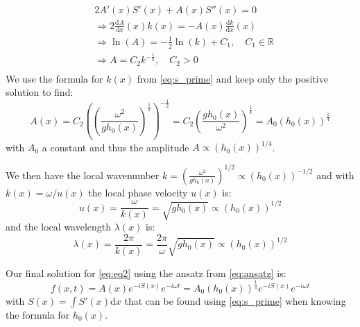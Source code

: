 \[
    \begin{aligned}
        & 2A'(x)S'(x) + A(x)S''(x) = 0 \\
        & \Rightarrow 2\frac{\mathrm{d}A}{\mathrm{d}x}(x)k(x) = - A(x) \frac{\mathrm{d}k}{\mathrm{d}x}(x) \\
        & \Rightarrow \ln(A) = -\frac{1}{2}\ln(k) + C_1, \quad C_1 \in \mathbb{R} \\
        & \Rightarrow A = C_2 k^{-\frac{1}{2}}, \quad C_2>0 \\
    \end{aligned}
\]
We use the formula for $k(x)$ from \autoref{eq:s_prime} and keep only the positive solution to find:
\begin{equation}
    A(x) = C_2 \left(\left(\frac{\omega^2}{gh_0(x)}\right)^{\frac{1}{2}}\right)^{-\frac{1}{2}} = C_2 \left(\frac{gh_0(x)}{\omega^2}\right)^\frac{1}{4} = A_0 (h_0(x))^\frac{1}{4}
\end{equation}
with $A_0$ a constant and thus the amplitude $A \propto (h_0(x))^{1/4}$.

We then have the local wavenumber $k = \left(\frac{\omega^2}{gh_0(x)}\right)^{1/2} \propto (h_0(x))^{-1/2}$ and with $k(x) = \omega / u(x)$ the local phase velocity $u(x)$ is:
\begin{equation}
    u(x) = \frac{\omega}{k(x)} = \sqrt{gh_0(x)} \propto (h_0(x))^{1/2}
\end{equation}
and the local wavelength $\lambda(x)$ is:
\begin{equation}
    \lambda(x) = \frac{2\pi}{k(x)} = \frac{2\pi}{\omega}\sqrt{gh_0(x)}  \propto (h_0(x))^{1/2}
\end{equation}

Our final solution for \autoref{eq:eq2} using the ansatz from \autoref{eq:ansatz} is:
\begin{equation}
    f(x,t) = A(x)e^{-iS(x)}e^{-i\omega t} = A_0 (h_0(x))^\frac{1}{4}e^{-iS(x)}e^{-i\omega t}
\end{equation}
with $S(x) = \int S'(x) \mathrm{d}x$ that can be found using \autoref{eq:s_prime} when knowing the formula for $h_0(x)$.


